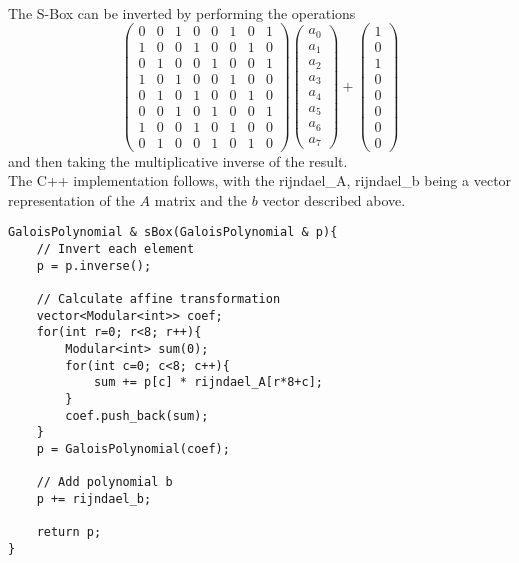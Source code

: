 \documentclass{article}
\begin{document}
\hfill\\
The S-Box can be inverted by performing the operations
\[\left( \begin{array}{cccccccc}
0 & 0 & 1 & 0 & 0 & 1 & 0 & 1 \\
1 & 0 & 0 & 1 & 0 & 0 & 1 & 0 \\
0 & 1 & 0 & 0 & 1 & 0 & 0 & 1 \\
1 & 0 & 1 & 0 & 0 & 1 & 0 & 0 \\
0 & 1 & 0 & 1 & 0 & 0 & 1 & 0 \\
0 & 0 & 1 & 0 & 1 & 0 & 0 & 1 \\
1 & 0 & 0 & 1 & 0 & 1 & 0 & 0 \\
0 & 1 & 0 & 0 & 1 & 0 & 1 & 0 \end{array} \right)
\left( \begin{array}{c}
a_0\\ a_1\\ a_2\\ a_3\\ a_4\\ a_5\\ a_6\\ a_7 \end{array} \right) +
\left( \begin{array}{c}
1\\ 0\\ 1\\ 0\\ 0\\ 0\\ 0\\ 0 \end{array} \right)\]
and then taking the multiplicative inverse of the result.
\hfill\\
The C++ implementation follows, with the rijndael\_A, rijndael\_b being a vector representation of the $A$ matrix and the $b$ vector described above.
\begin{lstlisting}
GaloisPolynomial & sBox(GaloisPolynomial & p){
    // Invert each element
    p = p.inverse();
    
    // Calculate affine transformation
    vector<Modular<int>> coef;
    for(int r=0; r<8; r++){
        Modular<int> sum(0);
        for(int c=0; c<8; c++){
            sum += p[c] * rijndael_A[r*8+c];
        }
        coef.push_back(sum);
    }
    p = GaloisPolynomial(coef);
    
    // Add polynomial b
    p += rijndael_b;
    
    return p;
}
\end{lstlisting}
\end{document}
